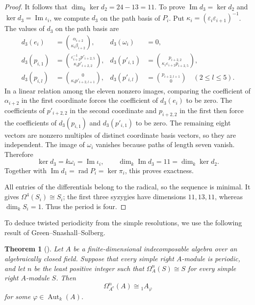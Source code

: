 \documentclass[a4paper,reqno,10pt]{amsart}
\newtheorem{theorem}{Theorem}[section]
\theoremstyle{definition}
\numberwithin{equation}{section}
\newcommand{\kfield}{k}
\newcommand{\rad}{\operatorname{rad}}
\newcommand{\Aut}{\operatorname{Aut}}
\newcommand{\im}{\operatorname{Im}}
\newcommand{\ee}{\mathrm e}
\begin{document}
\begin{proof}
It follows that $\dim_\kfield\ker d_2=24-13=11$. To prove
$\im d_3=\ker d_2$ and $\ker d_3=\im\iota_i$, we compute $d_3$
on the path basis of $P_i$. Put
$\kappa_i=(\varepsilon_i\varepsilon_{i+1})^{-1}$. The values of $d_3$
on the path basis are
\begin{align*}
 d_3(e_i)&=\binom{\alpha_{i+2}}{\kappa_i\beta_{i+2}},&
 d_3(\omega_i)&=0,\\
 d_3(p_{i,1})&=\binom{\varepsilon_{i+2}^{-1}p'_{i+2,5}}
                         {\kappa_i p'_{i+2,2}},&
 d_3(p'_{i,1})&=\binom{p_{i+2,2}}
                          {\kappa_i\varepsilon_{i+2}p_{i+2,5}},\\
 d_3(p_{i,l})&=\binom{0}{\kappa_i p'_{i+2,l+1}},&
 d_3(p'_{i,l})&=\binom{p_{i+2,l+1}}{0}\quad(2\leq l\leq5).
\end{align*}
In a linear relation among the eleven nonzero images, comparing the
coefficient of $\alpha_{i+2}$ in the first coordinate forces the coefficient
of $d_3(e_i)$ to be zero. The coefficients of $p'_{i+2,2}$ in the second
coordinate and $p_{i+2,2}$ in the first then force the coefficients of
$d_3(p_{i,1})$ and $d_3(p'_{i,1})$ to be zero. The remaining eight vectors are nonzero multiples of
distinct coordinate basis vectors, so they are independent. The image
of $\omega_i$ vanishes because paths of length seven vanish. Therefore
\[
 \ker d_3=\kfield\omega_i=\im\iota_i,
 \qquad \dim_\kfield\im d_3=11=\dim_\kfield\ker d_2.
\]
Together with $\im d_1=\rad P_i=\ker\pi_i$, this proves exactness.

All entries of the differentials belong to the radical, so the sequence is minimal. It gives $\Omega^4(S_i)\cong S_i$;
the first three syzygies have dimensions $11,13,11$, whereas
$\dim_\kfield S_i=1$. Thus the period is four.
\end{proof}

To deduce twisted periodicity from the simple resolutions, we use the
following result of Green--Snashall--Solberg.

\begin{theorem}[{\cite[Theorem~1.4 and its proof]{GreenSnashallSolberg}}]
\label{thm:gss}
Let $A$ be a finite-dimensional indecomposable algebra over an algebraically
closed field. Suppose that every simple right $A$-module is periodic, and
let $n$ be the least positive integer such that $\Omega_A^n(S)\cong S$
for every simple right $A$-module $S$. Then
\[
 \Omega_{A^{\ee}}^n(A)\cong {}_1A_\varphi
\]
for some $\varphi\in\Aut_\kfield(A)$.
\end{theorem}
\end{document}
